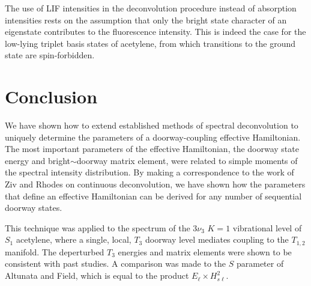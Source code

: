 \documentclass[12pt]{mitthesis}
\begin{document}
The use of LIF intensities in the deconvolution procedure instead of
absorption intensities rests on the assumption that only the bright
state character of an eigenstate contributes to the fluorescence
intensity.  This is indeed the case for the low-lying triplet basis
states of acetylene, from which transitions to the ground state are
spin-forbidden.  

\section{Conclusion}

We have shown how to extend established methods of spectral
deconvolution to uniquely determine the parameters of a
doorway-coupling effective Hamiltonian.  The most important parameters
of the effective Hamiltonian, the doorway state energy and
bright$\sim$doorway matrix element, were related to simple moments of
the spectral intensity distribution.  By making a correspondence to
the work of Ziv and Rhodes on continuous deconvolution, we have shown
how the parameters that define an effective Hamiltonian can be derived
for any number of sequential doorway states.

This technique was applied to the spectrum of the $3\nu_3$ $K=1$
vibrational level of $S_1$ acetylene, where a single, local, $T_3$
doorway level mediates coupling to the $T_{1,2}$ manifold.  The
deperturbed $T_3$ energies and matrix elements were shown to be
consistent with past studies.  A comparison was made to the $S$
parameter of Altunata and Field, which is equal to the product
$E_{\ell} \times H_{s\ell}^2$.



%


\end{document}
